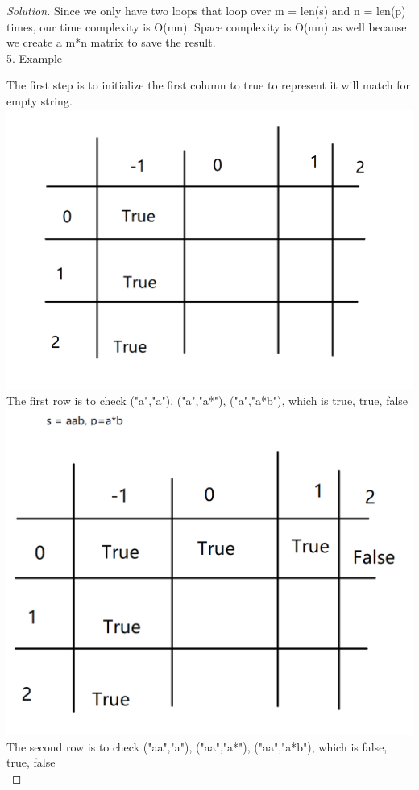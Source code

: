 \documentclass[12pt]{article}
\begin{document}
\begin{proof}[Solution]
	Since we only have two loops that loop over m = len(s) and n = len(p) times, our time complexity is O(mn). Space complexity is O(mn) as well because we create a m*n matrix to save the result.\\
	5. Example 
	
	The first step is to initialize the first column to true to represent it will match for empty string.\\
	\includegraphics[scale=0.3]{s0.png}\\
	The first row is to check ("a","a"), ("a","a*"), ("a","a*b"), which is true, true, false\\
	\includegraphics[scale=0.3]{s1.png}\\
	The second row is to check ("aa","a"), ("aa","a*"), ("aa","a*b"), which is false, true, false\\

\end{proof}
\end{document}
